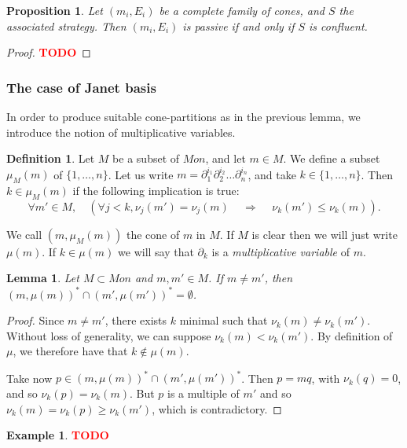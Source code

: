 \documentclass[10pt]{easychair}
\newtheorem{lemma}[theorem]{Lemma}
\newtheorem{proposition}[theorem]{Proposition}
\theoremstyle{definition}
\newtheorem{definition}[theorem]{Definition}
\newtheorem{example}[theorem]{Example}
\newcommand\todo[1]{{\bf\textcolor{red}{#1}}}
\begin{document}
\begin{proposition}
  Let $(m_i,E_i)$ be a complete family of cones, and $S$ the associated strategy.
  Then $(m_i,E_i)$ is passive if and only if $S$ is confluent. 
\end{proposition}
\begin{proof}
\todo{TODO} 
\end{proof}

\subsubsection{The case of Janet basis}

In order to produce suitable cone-partitions as in the previous lemma,
we introduce the notion of multiplicative variables.

\begin{definition}
  Let $M$ be a subset of $Mon$, and let $m  \in M$. We define a subset $\mu_M(m)$
  of $\{1,\ldots,n\}$. Let us write $m = \partial_1^{i_1}\partial_2^{i_2}\ldots \partial_n^{i_n}$, and take
  $k \in \{1,\ldots,n\}$. Then $k \in \mu_M(m)$ if the following implication is true:
  \[
\forall m' \in M, \quad (\forall j < k, \nu_j(m') = \nu_j(m) \, \quad \Rightarrow \quad \, \nu_k(m') \leq \nu_k(m)).
  \]
  

  We call $(m,\mu_M(m))$ the cone of $m$ in $M$. If $M$ is clear then we will
  just write $\mu(m)$. If $k \in \mu(m)$ we will say that $\partial_k$ is a
  \emph{multiplicative variable} of $m$.
\end{definition}

\begin{lemma}\label{lem:multiplicative_cones_disjoint}
Let $M \subset Mon$ and $m,m' \in M$. If $m \neq m'$, then $(m,\mu(m))^* \cap (m',\mu(m'))^* = \emptyset$.
\end{lemma}
\begin{proof}
  Since $m \neq m'$, there exists $k$ minimal such that $\nu_k(m) \neq \nu_k(m')$.
  Without loss of generality, we can suppose $\nu_k(m) < \nu_k(m')$.
  By definition of $\mu$, we therefore have that $k \notin \mu(m)$.

  Take now $p \in (m,\mu(m))^* \cap (m',\mu(m'))^*$. Then $p = mq$, with $\nu_k(q) = 0$,
  and so $\nu_k(p) = \nu_k(m)$. But $p$ is a multiple of $m'$ and so
  $\nu_k(m) = \nu_k(p) \geq \nu_k(m')$, which is contradictory.
 \end{proof}

 \begin{example}
\todo{TODO}
 \end{example}
\end{document}
